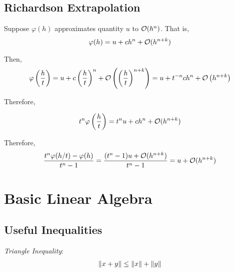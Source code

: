 \documentclass[12pt]{article}
\begin{document}
\subsection{Richardson Extrapolation}                                                                                                                       
Suppose \( \varphi(h) \) approximates quantity \( u \) to \( \mathcal{O}(h^n) \). That is,
\begin{align*}
    \varphi(h) = u + c h^n + \mathcal{O}(h^{n+k})
\end{align*}

Then,                                                                                                                                                    
\begin{align*}
    \varphi \left( \frac{h}{t} \right) = u + c \left( \frac{h}{t} \right)^n + \mathcal{O} \left( \left( \frac{h}{t} \right)^{n+k} \right)
    = u + t^{-n} c h^n + \mathcal{O}\left( h^{n+k} \right)
\end{align*}

Therefore,

\begin{align*}
    t^n \varphi \left( \frac{h}{t} \right) = t^n u + c h^n + \mathcal{O}(h^{n+k})
\end{align*}


Therefore,   
\begin{align*}                                                                                                                                           
    \frac{t^n \varphi(h/t) - \varphi(h)}{t^n-1}
    = \frac{(t^n-1)u + \mathcal{O}(h^{n+k})}{t^n-1}                                                                                                              = u + \mathcal{O}(h^{n+k})                                                                                                                                 
\end{align*}  

\pagebreak
\section{Basic Linear Algebra}

\subsection{Useful Inequalities}

\textit{Triangle Inequality}:
\begin{align*}
    \left\lVert x+y\right\rVert \leq \left\lVert x\right\rVert + \left\lVert y\right\rVert
\end{align*}
\end{document}
